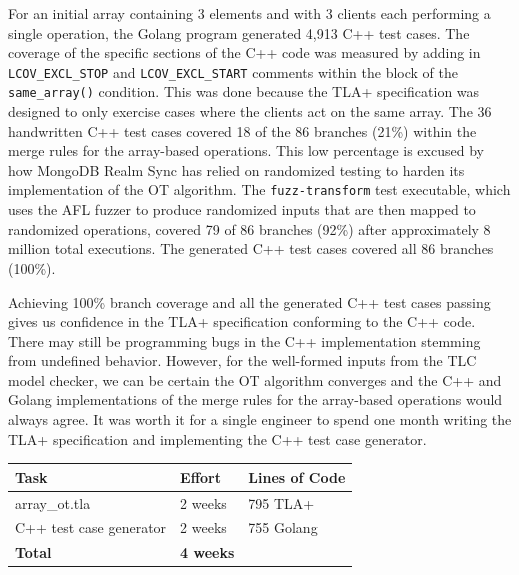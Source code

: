 \documentclass{vldb}
\begin{document}
For an initial array containing 3 elements and with 3 clients each performing a single operation, the Golang program generated 4,913 C++ test cases.
The coverage of the specific sections of the C++ code was measured by adding in \texttt{LCOV\_EXCL\_STOP} and \texttt{LCOV\_EXCL\_START} comments within the block of the \texttt{same\_array()} condition. This was done because the TLA+ specification was designed to only exercise cases where the clients act on the same array.
The 36 handwritten C++ test cases covered 18 of the 86 branches (21\%) within the merge rules for the array-based operations.
This low percentage is excused by how MongoDB Realm Sync has relied on randomized testing to harden its implementation of the OT algorithm.
The \texttt{fuzz-transform} test executable, which uses the AFL fuzzer \cite{AFLHomepage} to produce randomized inputs that are then mapped to randomized operations, covered 79 of 86 branches (92\%) after approximately 8 million total executions.
The generated C++ test cases covered all 86 branches (100\%).



Achieving 100\% branch coverage and all the generated C++ test cases passing gives us confidence in the TLA+ specification conforming to the C++ code.
There may still be programming bugs in the C++ implementation stemming from undefined behavior.
However, for the well-formed inputs from the TLC model checker, we can be certain the OT algorithm converges and the C++ and Golang implementations of the merge rules for the array-based operations would always agree.
It was worth it for a single engineer to spend one month writing the TLA+ specification and implementing the C++ test case generator.


\begin{center}
\begin{tabular}{ | m{11em} | m{5em}| m{6em} | } 
\hline
Task & Effort & Lines of Code \\  
\hline
array\_ot.tla & 2 weeks & 795 TLA+ \\
C++ test case generator & 2 weeks & 755 Golang \\
\textbf{Total} & \textbf{4 weeks} & \\
\hline
\end{tabular}
\end{center}
\end{document}
